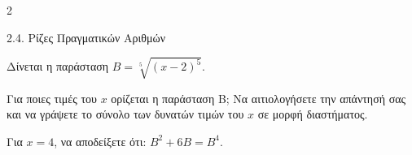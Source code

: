 \begin{ylh}{2}
    \item 2.4. Ρίζες Πραγματικών Αριθμών
\end{ylh}
Δίνεται η παράσταση $B = \sqrt[5]{(x - 2)^5}$.

\begin{alist}
\item Για ποιες τιμές του $x$ ορίζεται η παράσταση Β; Να αιτιολογήσετε την απάντησή σας και να γράψετε το σύνολο των δυνατών τιμών του $x$ σε μορφή διαστήματος.
\item Για $x = 4$, να αποδείξετε ότι: $B^2 + 6B = B^4$.
\end{alist}

